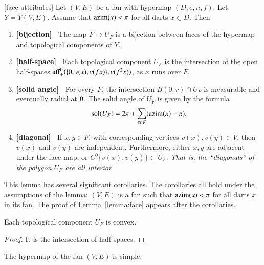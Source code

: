 \begin{lemma}[face attributes]\label{lemma:face}
Let $(V,E)$ be a fan with hypermap $(D,e,n,f)$. 
Let $Y=Y(V,E)$.
Assume that ${\operatorname{azim}}(x)<\pi$
for all darts $x\in D$.  Then
\begin{enumerate}
\item {\bf [bijection]~} The map $F\mapsto U_F$ is a bijection between faces of the hypermap
and topological components of $Y$.
\item  {\bf [half-space]~} Each topological component $U_F$ is the intersection of the open
half-spaces ${\operatorname{aff}}_+^0(\{0,v(x),v({f x})\},v(f^2 x))$, as $x$ runs
over $F$.
\item {\bf [solid angle]~} For every $F$, the intersection $B(0,r)\cap U_F$ is measurable and
eventually radial at $0$.  The solid angle of $U_F$ is given by the
formula
$$
\operatorname{sol}(U_F) = 2\pi + \sum_{x\in F}({\operatorname{azim}}(x)-\pi).
$$
\item {\bf [diagonal]~}  If $x,y\in F$, with corresponding vertices $v(x),v(y)\in V$, then
$v(x)$ and $v(y)$ are independent.
Furthermore, 
either $x,y$ are adjacent under the face map, or $C^0\{v(x),v(y)\}\subset U_F$.  {\it That is, the ``diagonals'' of the polygon $U_F$ are all interior.}
\end{enumerate}
\end{lemma}

This lemma has several significant corollaries.  The corollaries all hold under the assumptions of the lemma: $(V,E)$ is a fan such that ${\operatorname{azim}}(x)<\pi$ for all darts $x$ in its fan.  The proof of Lemma~\ref{lemma:face} appears after the corollaries.

\begin{corollary}
Each topological component $U_F$ is convex.
\end{corollary}

\begin{proof} It is the intersection of half-spaces.
\end{proof}

\begin{corollary}  
The hypermap of the fan $(V,E)$ is simple.
\end{corollary}

